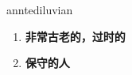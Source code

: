 
\begin{frame}
{\huge anntediluvian}
\begin{center}
\begin{enumerate}\Large
  \item \textbf{非常古老的，过时的}
  \item \textbf{保守的人}
\end{enumerate}
\end{center}
\end{frame}
